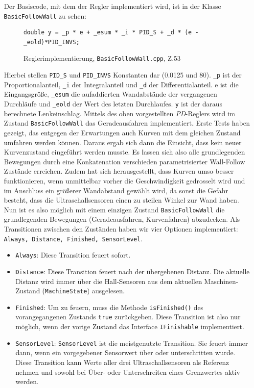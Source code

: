 Der Basiscode, mit dem der Regler implementiert wird, ist in der Klasse \texttt{BasicFollowWall} zu sehen:

\begin{figure}[H]
\begin{lstlisting}[style=json]
double y = _p * e + _esum * _i * PID_S + _d * (e - _eold)*PID_INVS;
\end{lstlisting}
\centering
\caption{Reglerimplementierung, \texttt{BasicFollowWall.cpp}, Z.53}
\end{figure}

Hierbei stellen \texttt{PID\_S} und \texttt{PID\_INVS} Konstanten dar (0.0125 und 80). \texttt{\_p} ist der Proportionalanteil, \texttt{\_i} der Integralanteil und \texttt{\_d} der Differentialanteil. e ist die Eingangsgröße, \texttt{\_esum} die aufaddierten Wandabstände der vergangenen Durchläufe und \texttt{\_eold} der Wert des letzten Durchlaufes. \texttt{y} ist der daraus berechnete Lenkeinschlag.
\newline
\newline
Mittels des oben vorgestellten \textit{PD}-Reglers wird im Zustand \texttt{BasicFollowWall} das Geradeausfahren implementiert. Erste Tests haben gezeigt, das entgegen der Erwartungen auch Kurven mit dem gleichen Zustand umfahren werden können. Daraus ergab sich dann die Einsicht, dass kein neuer Kurvenzustand eingeführt werden musste. Es lassen sich also alle grundlegenden Bewegungen durch eine Konkatenation verschieden parametrisierter Wall-Follow Zustände erreichen. Zudem hat sich herausgestellt, dass Kurven umso besser funktionieren, wenn unmittelbar vorher die Geschwindigkeit gedrosselt wird und im Anschluss ein größerer Wandabstand gewählt wird, da sonst die Gefahr besteht, dass die Ultraschallsensoren einen zu steilen Winkel zur Wand haben. 
Nun ist es also möglich mit einem einzigen Zustand \texttt{BasicFollowWall} die grundlegenden Bewegungen (Geradeausfahren, Kurvenfahren) abzudecken. Als Transitionen zwischen den Zuständen haben wir vier Optionen implementiert: \texttt{Always, Distance, Finished, SensorLevel}. 
\begin{itemize}
	\item \texttt{Always}: Diese Transition feuert sofort.
	\item \texttt{Distance}: Diese Transition feuert nach der übergebenen Distanz. Die aktuelle Distanz wird immer über die Hall-Sensoren aus dem aktuellen Maschinen-Zustand (\texttt{MachineState}) ausgelesen. 
	\item \texttt{Finished}: Um zu feuern, muss die Methode \texttt{isFinished()} des vorangegangenen Zustands \texttt{true} zurückgeben. Diese Transition ist also nur möglich, wenn der vorige Zustand das Interface \texttt{IFinishable} implementiert. 
	\item \texttt{SensorLevel}:	\texttt{SensorLevel} ist die meistgenutzte Transition. Sie feuert immer dann, wenn ein vorgegebener Sensorwert über oder unterschritten wurde. Diese Transition kann Werte aller drei Ultraschallsensoren als Referenz nehmen und sowohl bei Über- oder Unterschreiten eines Grenzwertes aktiv werden. 
\end{itemize}
